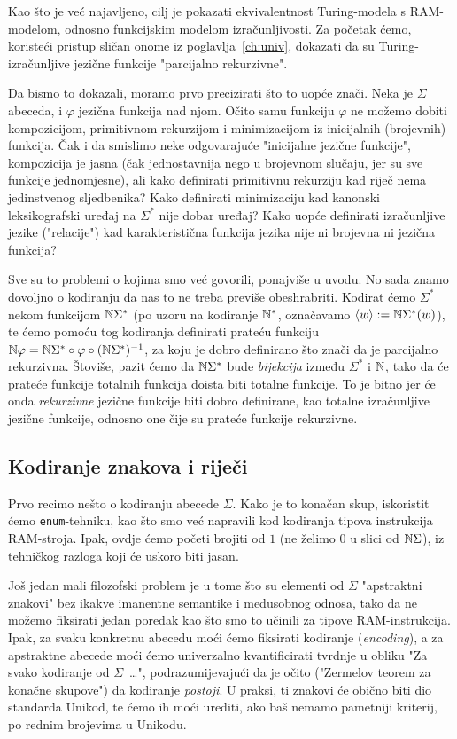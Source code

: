 Kao što je već najavljeno, cilj je pokazati ekvivalentnost Turing-modela s RAM-modelom, odnosno funkcijskim modelom izračunljivosti. Za početak ćemo, koristeći pristup sličan onome iz poglavlja~\ref{ch:univ}, dokazati da su Turing-izračunljive jezične funkcije "parcijalno rekurzivne".

Da bismo to dokazali, moramo prvo precizirati što to uopće znači. Neka je $\Sigma$ abeceda, i $\varphi$ jezična funkcija nad njom. Očito samu funkciju $\varphi$ ne možemo dobiti kompozicijom, primitivnom rekurzijom i minimizacijom iz inicijalnih (brojevnih) funkcija. Čak i da smislimo neke odgovarajuće "inicijalne jezične funkcije", kompozicija je jasna (čak jednostavnija nego u brojevnom slučaju, jer su sve funkcije jednomjesne), ali kako definirati primitivnu rekurziju kad riječ nema jedinstvenog sljedbenika? Kako definirati minimizaciju kad kanonski leksikografski uređaj na $\Sigma^*$ nije dobar uređaj? Kako uopće definirati izračunljive jezike ("relacije") kad karakteristična funkcija jezika nije ni brojevna ni jezična funkcija?

Sve su to problemi o kojima smo već govorili, ponajviše u uvodu. No sada znamo dovoljno o kodiranju da nas to ne treba previše obeshrabriti. Kodirat ćemo $\Sigma^*$ nekom funkcijom ${\mathbb N}\Sigma^*$ (po uzoru na kodiranje ${\mathbb N}^*$, označavamo $\langle w\rangle:={\mathbb N}\Sigma^*(w)$), te ćemo pomoću tog kodiranja definirati prateću funkciju ${\mathbb N}\varphi={\mathbb N}\Sigma^*\circ\varphi\circ({\mathbb N}\Sigma^*)^{-1}$, za koju je dobro definirano što znači da je parcijalno rekurzivna.
Štoviše, pazit ćemo da ${\mathbb N}\Sigma^*$ bude \emph{bijekcija} između $\Sigma^*$ i ${\mathbb N}$, tako da će prateće funkcije totalnih funkcija doista biti totalne funkcije. To je bitno jer će onda \emph{rekurzivne} jezične funkcije biti dobro definirane, kao totalne izračunljive jezične funkcije, odnosno one čije su prateće funkcije rekurzivne.

\subsection{Kodiranje znakova i riječi}\label{sec:kSigma}

Prvo recimo nešto o kodiranju abecede $\Sigma$. Kako je to konačan skup, iskoristit ćemo \texttt{enum}-tehniku, kao što smo već napravili kod kodiranja tipova instrukcija RAM-stroja. Ipak, ovdje ćemo početi brojiti od $1$ (ne želimo $0$ u slici od ${\mathbb N}\Sigma$), iz tehničkog razloga koji će uskoro biti jasan.

Još jedan mali filozofski problem je u tome što su elementi od $\Sigma$ "apstraktni znakovi" bez ikakve imanentne semantike i međusobnog odnosa, tako da ne možemo fiksirati jedan poredak kao što smo to učinili za tipove RAM-instrukcija. Ipak, za svaku konkretnu abecedu moći ćemo fiksirati kodiranje (\emph{encoding}), a za apstraktne abecede moći ćemo univerzalno kvantificirati tvrdnje u obliku "Za svako kodiranje od $\Sigma$~\ldots", podrazumijevajući da je očito ("Zermelov teorem za konačne skupove") da kodiranje \emph{postoji}. U praksi, ti znakovi će obično biti dio standarda Unikod, te ćemo ih moći urediti, ako baš nemamo pametniji kriterij, po rednim brojevima u Unikodu.

